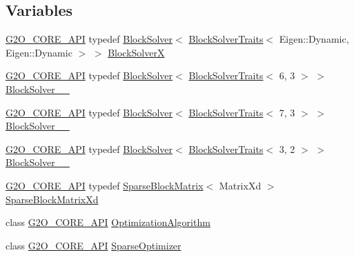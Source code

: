 \subsection*{Variables}
\begin{DoxyCompactItemize}
\item 
\mbox{\hyperlink{g2o__core__api_8h_a7a8d7648d6f1e26632566f335751d064}{G2\+O\+\_\+\+C\+O\+R\+E\+\_\+\+A\+PI}} typedef \mbox{\hyperlink{classg2o_1_1_block_solver}{Block\+Solver}}$<$ \mbox{\hyperlink{structg2o_1_1_block_solver_traits}{Block\+Solver\+Traits}}$<$ Eigen\+::\+Dynamic, Eigen\+::\+Dynamic $>$ $>$ \mbox{\hyperlink{namespaceg2o_adcc6ea7cf60314982bc91e7b926adf14}{Block\+SolverX}}
\item 
\mbox{\hyperlink{g2o__core__api_8h_a7a8d7648d6f1e26632566f335751d064}{G2\+O\+\_\+\+C\+O\+R\+E\+\_\+\+A\+PI}} typedef \mbox{\hyperlink{classg2o_1_1_block_solver}{Block\+Solver}}$<$ \mbox{\hyperlink{structg2o_1_1_block_solver_traits}{Block\+Solver\+Traits}}$<$ 6, 3 $>$ $>$ \mbox{\hyperlink{namespaceg2o_ac2431e417f239680e2d2436970713e84}{Block\+Solver\+\_\+\_}}
\item 
\mbox{\hyperlink{g2o__core__api_8h_a7a8d7648d6f1e26632566f335751d064}{G2\+O\+\_\+\+C\+O\+R\+E\+\_\+\+A\+PI}} typedef \mbox{\hyperlink{classg2o_1_1_block_solver}{Block\+Solver}}$<$ \mbox{\hyperlink{structg2o_1_1_block_solver_traits}{Block\+Solver\+Traits}}$<$ 7, 3 $>$ $>$ \mbox{\hyperlink{namespaceg2o_a722b0d55b4695c7968d67107aee7671c}{Block\+Solver\+\_\+\_}}
\item 
\mbox{\hyperlink{g2o__core__api_8h_a7a8d7648d6f1e26632566f335751d064}{G2\+O\+\_\+\+C\+O\+R\+E\+\_\+\+A\+PI}} typedef \mbox{\hyperlink{classg2o_1_1_block_solver}{Block\+Solver}}$<$ \mbox{\hyperlink{structg2o_1_1_block_solver_traits}{Block\+Solver\+Traits}}$<$ 3, 2 $>$ $>$ \mbox{\hyperlink{namespaceg2o_a0dc4e6a4c5ab92d4c638aca75ad8219c}{Block\+Solver\+\_\+\_}}
\item 
\mbox{\hyperlink{g2o__core__api_8h_a7a8d7648d6f1e26632566f335751d064}{G2\+O\+\_\+\+C\+O\+R\+E\+\_\+\+A\+PI}} typedef \mbox{\hyperlink{classg2o_1_1_sparse_block_matrix}{Sparse\+Block\+Matrix}}$<$ Matrix\+Xd $>$ \mbox{\hyperlink{namespaceg2o_a711432ca707cf7aee387c3cca80d84e7}{Sparse\+Block\+Matrix\+Xd}}
\item 
class \mbox{\hyperlink{g2o__core__api_8h_a7a8d7648d6f1e26632566f335751d064}{G2\+O\+\_\+\+C\+O\+R\+E\+\_\+\+A\+PI}} \mbox{\hyperlink{namespaceg2o_a3beb17b066b63dedd1d49fe5c8db1b3e}{Optimization\+Algorithm}}
\item 
class \mbox{\hyperlink{g2o__core__api_8h_a7a8d7648d6f1e26632566f335751d064}{G2\+O\+\_\+\+C\+O\+R\+E\+\_\+\+A\+PI}} \mbox{\hyperlink{namespaceg2o_a9b3a9d8e71f5779358eaa12ed7cb8b4c}{Sparse\+Optimizer}}
\end{DoxyCompactItemize}


